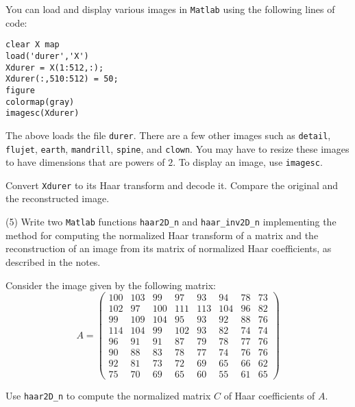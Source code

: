 \documentclass[12pt]{article}
\begin{document}
\medskip
You can load and display 
various images in {\tt Matlab} using the following lines of code:
\begin{verbatim}
clear X map
load('durer','X')
Xdurer = X(1:512,:);
Xdurer(:,510:512) = 50;
figure
colormap(gray)
imagesc(Xdurer)
\end{verbatim}
The above loads the file {\tt durer}.
There are a few other  images such as {\tt detail}, {\tt flujet}, {\tt earth},
{\tt mandrill}, {\tt spine}, and {\tt clown}. You may have to resize
these images to have dimensions that are powers of $2$.
To display an image, use {\tt imagesc}.

\medskip
Convert {\tt Xdurer}  to its Haar transform and decode it. Compare the
original and the reconstructed image.


\medskip
(5)
Write two {\tt Matlab} functions {\tt haar2D\_n} and {\tt haar\_inv2D\_n}
implementing the method for computing the normalized Haar transform
of a  matrix and the reconstruction of an image from its matrix of
normalized Haar
coefficients, as described in the notes.

\medskip
Consider the image given by the following matrix:
\[
A =
\begin{pmatrix}
100 & 103 & 99 & 97 & 93 & 94 & 78 & 73 \\
 102 & 97 & 100 & 111 & 113 & 104 & 96 & 82 \\
 99 & 109 & 104 & 95 & 93 & 92 & 88 & 76 \\
 114 & 104 &  99 & 102 & 93 & 82 & 74 & 74 \\
 96 & 91 & 91 & 87 & 79 & 78 & 77 & 76 \\
 90 & 88 & 83 & 78 & 77 & 74 & 76 & 76 \\
 92 & 81 & 73 & 72 & 69 & 65 & 66 & 62 \\
 75 & 70 & 69 & 65 & 60 & 55 & 61 & 65
\end{pmatrix}
\]

Use {\tt haar2D\_n} to compute the normalized matrix $C$ of Haar
coefficients of $A$.
\end{document}
